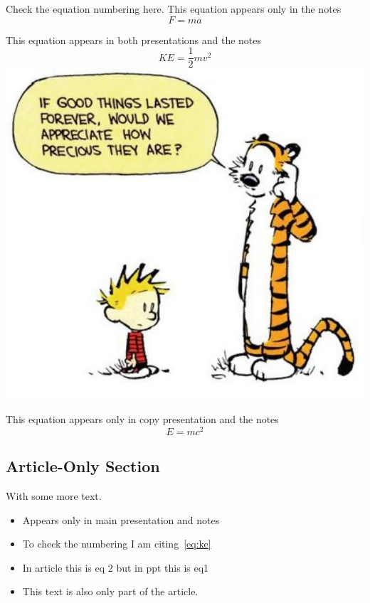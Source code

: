Check the equation numbering here. This equation appears only in the notes
\begin{equation}
F = ma\label{eq:fma}
\end{equation}
\begin{frame}[label=both]
This equation appears in both presentations and the notes
	\begin{equation}
KE = \frac{1}{2}mv^2\label{eq:ke}
\end{equation}
\includegraphics[scale=0.3]{ch}
\end{frame}
\begin{frame}[label=copy]
This equation appears only in copy presentation and the notes
	\begin{equation}
E = mc^2\label{eq:emc2}
\end{equation}
\end{frame}
\subsection<article>{Article-Only Section}
With some more text.
\begin{frame}[label=main]
\begin{itemize}
\item Appears only in main presentation and notes
\item To check the numbering I am citing~\cref{eq:ke}
\item In article this is eq 2 but in ppt this is eq1
\item<presentation:only@0> This text is also only part of the article.
\end{itemize}
\end{frame}

